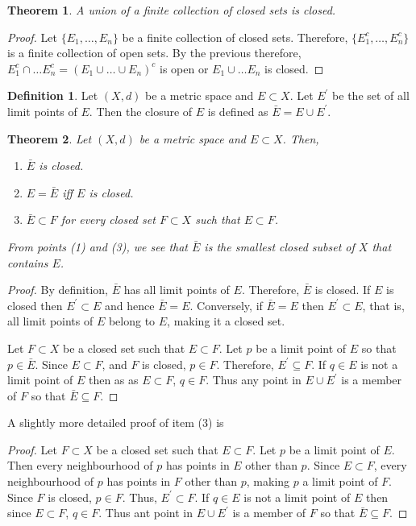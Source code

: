 \documentclass{article}
\theoremstyle{plain}
\newtheorem{thm}{Theorem}
\numberwithin{thm}{section}
\theoremstyle{plain}
\numberwithin{prop}{section}
\theoremstyle{definition}
\newtheorem{defn}{Definition}
\numberwithin{defn}{section}
\theoremstyle{remark}
\numberwithin{equation}{section}
\newcommand{\op}{\prime}
\begin{document}
\begin{thm}\label{s1t6}
A union of a finite collection of closed sets is closed.
\end{thm}
\begin{proof}
Let $\{E_1, \ldots, E_n\}$ be a finite collection of closed sets. Therefore,
$\{E_1^c, \ldots, E_n^c\}$ is a finite collection of open sets. By the previous
therefore, $E_1^c \cap \ldots E_n^c = (E_1 \cup \ldots \cup E_n)^c$ is open or
$E_1 \cup \ldots E_n$ is closed.
\end{proof}

\begin{defn}\label{s1d15}
Let $(X, d)$ be a metric space and $E \subset X$. Let $E^\op$ be the set of all
limit points of $E$. Then the closure of $E$ is defined as $\bar{E} = E \cup
E^\op$.
\end{defn}

\begin{thm}\label{s1t7}
Let $(X, d)$ be a metric space and $E \subset X$. Then,
\begin{enumerate}
\item $\bar{E}$ is closed.
\item $E = \bar{E}$ iff $E$ is closed.
\item $\bar{E} \subset F$ for every closed set $F \subset X$ such that $E 
\subset F$. 
\end{enumerate}
From points (1) and (3), we see that $\bar{E}$ is the smallest closed subset of
$X$ that contains $E$.
\end{thm}
\begin{proof}
By definition, $\bar{E}$ has all limit points of $E$. Therefore, $\bar{E}$ is 
closed. If $E$ is closed then $E^\op \subset E$ and hence $\bar{E} = E$. 
Conversely, if $\bar{E} = E$ then $E^\op \subset E$, that is, all limit points
of $E$ belong to $E$, making it a closed set.

Let $F \subset X$ be a closed set such that $E \subset F$. Let $p$ be a limit
point of $E$ so that $p \in \bar{E}$. Since $E \subset F$, and $F$ is closed, 
$p \in F$. Therefore, $E^\op \subseteq F$. If $q \in E$ is not a limit point of
$E$ then as as $E \subset F$, $q \in F$. Thus any point in $E \cup E^\op$ is a
member of $F$ so that $\bar{E} \subseteq F$.
\end{proof}

A slightly more detailed proof of item (3) is
\begin{proof}
Let $F \subset X$ be a closed set such that $E \subset F$. Let $p$ be a limit
point of $E$. Then every neighbourhood of $p$ has points in $E$ other than $p$.
Since $E \subset F$, every neighbourhood of $p$ has points in $F$ other than
$p$, making $p$ a limit point of $F$. Since $F$ is closed, $p \in F$. Thus,
$E^\op \subset F$. If $q \in E$ is not a limit point of $E$ then since $E 
\subset F$, $q \in F$. Thus ant point in $E \cup E^\op$ is a member of $F$ so
that $\bar{E} \subseteq F$.
\end{proof}
\end{document}
